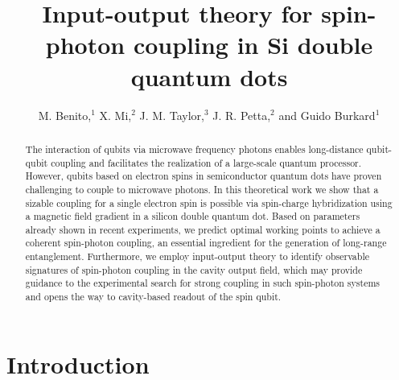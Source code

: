 \documentclass[twocolumn,english,aps,prl,preprint,reprint,showpacs,longbibliography,showkeys]{revtex4-1}
\begin{document}
\title{Input-output theory for spin-photon  coupling in Si double quantum dots}

\author{M. Benito,$^{1}$ X. Mi,$^{2}$ J. M. Taylor,$^{3}$ J. R. Petta,$^{2}$  and Guido Burkard$^{1}$}


\address{$^{1}$Department of Physics, University of Konstanz, D-78457 Konstanz, Germany}

\address{$^{2}$Department of Physics, Princeton University, Princeton, New Jersey 08544, USA}

\address{$^{3}$Joint Quantum Institute/NIST, 
College Park, Maryland 20742, USA}


\begin{abstract}
The interaction of qubits via microwave frequency photons 
 enables long-distance qubit-qubit coupling
 and facilitates the realization of a large-scale quantum processor.
However, qubits based on electron spins in semiconductor quantum dots
 have proven challenging to couple to microwave photons.
In this theoretical work we show that a sizable coupling for a single electron spin is possible via spin-charge hybridization using a magnetic field gradient  in a silicon double quantum dot.
Based on parameters already shown in recent experiments, we predict optimal working points to achieve a coherent spin-photon coupling, an essential ingredient for the generation of long-range entanglement.
Furthermore, we employ input-output theory to identify  observable signatures of spin-photon coupling in the 
cavity output field, which may provide guidance to the experimental search for strong coupling in such spin-photon systems and 
 opens the way to cavity-based readout of the spin qubit.
\end{abstract}




\maketitle
\section{Introduction}
\end{document}
